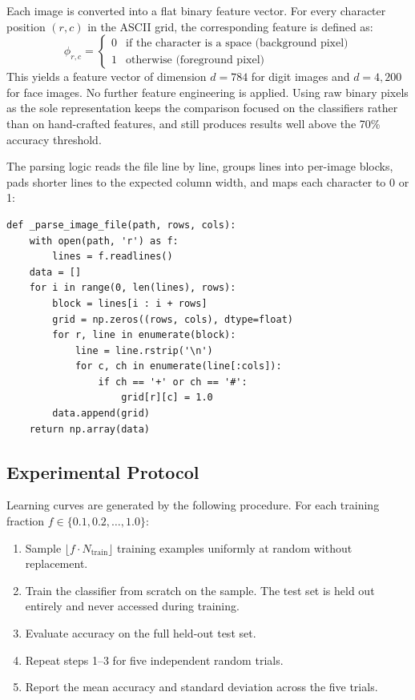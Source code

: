 \documentclass[12pt]{article}
\begin{document}
Each image is converted into a flat binary feature vector. For every character position
$(r, c)$ in the ASCII grid, the corresponding feature is defined as:
\[
  \phi_{r,c} =
  \begin{cases}
    0 & \text{if the character is a space (background pixel)} \\
    1 & \text{otherwise (foreground pixel)}
  \end{cases}
\]
This yields a feature vector of dimension $d = 784$ for digit images and $d = 4{,}200$
for face images. No further feature engineering is applied. Using raw binary pixels as
the sole representation keeps the comparison focused on the classifiers rather than on
hand-crafted features, and still produces results well above the 70\% accuracy threshold.

The parsing logic reads the file line by line, groups lines into per-image blocks, pads
shorter lines to the expected column width, and maps each character to 0 or 1:

\begin{lstlisting}[caption={Binary pixel extraction from ASCII image files (\texttt{util\_digits.py}, \texttt{util\_faces.py})}, label=lst:parse]
def _parse_image_file(path, rows, cols):
    with open(path, 'r') as f:
        lines = f.readlines()
    data = []
    for i in range(0, len(lines), rows):
        block = lines[i : i + rows]
        grid = np.zeros((rows, cols), dtype=float)
        for r, line in enumerate(block):
            line = line.rstrip('\n')
            for c, ch in enumerate(line[:cols]):
                if ch == '+' or ch == '#':
                    grid[r][c] = 1.0
        data.append(grid)
    return np.array(data)
\end{lstlisting}

\subsection{Experimental Protocol}

Learning curves are generated by the following procedure. For each training fraction
$f \in \{0.1, 0.2, \ldots, 1.0\}$:
\begin{enumerate}
  \item Sample $\lfloor f \cdot N_\text{train} \rfloor$ training examples uniformly at
    random without replacement.
  \item Train the classifier from scratch on the sample. The test set is held out
    entirely and never accessed during training.
  \item Evaluate accuracy on the full held-out test set.
  \item Repeat steps 1--3 for five independent random trials.
  \item Report the mean accuracy and standard deviation across the five trials.
\end{enumerate}
\end{document}
